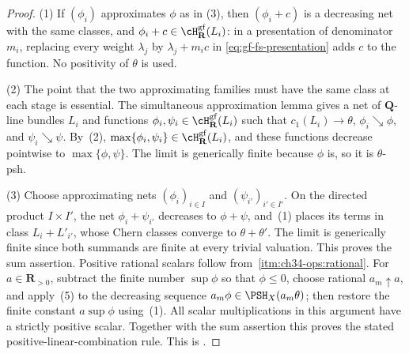 \begin{proof}
(1) If \((\phi_i)\) approximates \(\phi\) as in (3), then
\((\phi_i+c)\) is a decreasing net with the same classes, and
\(\phi_i+c\in\cH^{\mathrm{gf}}_{\mathbf R}(L_i)\): in a presentation of
denominator \(m_i\), replacing every weight \(\lambda_j\) by
\(\lambda_j+m_i c\) in \eqref{eq:gf-fs-presentation} adds \(c\) to the
function.  No positivity of \(\theta\) is used.

(2) The point that the two approximating families must have the same class
at each stage is essential.  The simultaneous approximation lemma
\cite[Lemma~4.9]{BJ22} gives a net of \(\mathbf Q\)-line bundles \(L_i\) and
functions
\(\phi_i,\psi_i\in\cH^{\mathrm{gf}}_{\mathbf R}(L_i)\) such that
\(c_1(L_i)\to\theta\), \(\phi_i\searrow\phi\), and
\(\psi_i\searrow\psi\).  By
\,(2),
\(\max\{\phi_i,\psi_i\}\in
\cH^{\mathrm{gf}}_{\mathbf R}(L_i)\), and these functions decrease
pointwise to \(\max\{\phi,\psi\}\).  The limit is generically finite
because \(\phi\) is, so it is \(\theta\)-psh.

(3) Choose approximating nets \((\phi_i)_{i\in I}\) and
\((\psi_{i'})_{i'\in I'}\).  On the directed product \(I\times I'\), the
net \(\phi_i+\psi_{i'}\) decreases to \(\phi+\psi\), and
\,(1) places its terms in class
\(L_i+L'_{i'}\), whose Chern classes converge to \(\theta+\theta'\).
The limit is generically finite since both summands are finite at every
trivial valuation.  This proves the sum assertion.  Positive rational
scalars follow from
\,\cref{itm:ch34-ops:rational}.  For
\(a\in\mathbf R_{>0}\), subtract the finite number \(\sup\phi\) so that
\(\phi\leq0\), choose rational \(a_m\uparrow a\), and apply~(5) to the
decreasing sequence \(a_m\phi\in\PSH_X(a_m\theta)\); then restore the
finite constant \(a\sup\phi\) using~(1).  All scalar multiplications in
this argument have a strictly positive scalar.  Together with the sum
assertion this proves the stated positive-linear-combination rule.  This is
\cite[Theorem~4.7\,(i)--(ii)]{BJ22}.


\end{proof}
